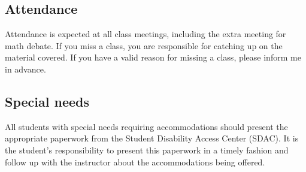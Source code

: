 \documentclass[oneside,11pt]{amsart}
\begin{document}
\subsection{Attendance}

Attendance is expected at all class meetings, including the extra meeting for math debate. If you miss a class, you are responsible for catching up on the material covered. If you have a valid reason for missing a class, please inform me in advance.

\subsection{Special needs}

All students with special needs requiring accommodations should present the appropriate paperwork from the Student Disability Access Center (SDAC). It is the student's responsibility to present this paperwork in a timely fashion and follow up with the instructor about the accommodations being offered. 

%
\end{document}

